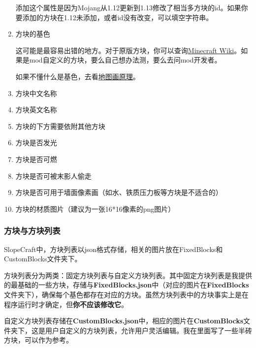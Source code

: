 \documentclass[UTF8]{ctexart}
\begin{document}
\begin{enumerate}
   添加这个属性是因为Mojang从1.12更新到1.13修改了相当多方块的id。如果你要添加的方块在1.12未添加，或者id没有改变，可以填空字符串。
   \item 方块的基色
   
   这可能是最容易出错的地方。对于原版方块，你可以查询\href{https://wiki.biligame.com/mc/%E5%9C%B0%E5%9B%BE%E7%89%A9%E5%93%81%E6%A0%BC%E5%BC%8F#idcounts.dat_.E6.A0.BC.E5.BC.8F}{Minecraft Wiki}。如果是mod自定义的方块，要么自己想办法测，要么去问mod开发者。
   
   如果不懂什么是基色，去看\href{https://github.com/ToKiNoBug/SlopeCraftTutorial/blob/main/BasicPrinciple/Principle%20of%20map%20pixel%20arts.md}{地图画原理}。
   \item 方块中文名称
   \item 方块英文名称
   \item 方块的下方需要依附其他方块
   \item 方块是否发光
   \item 方块是否可燃
   \item 方块是否可被末影人偷走
   \item 方块是否可用于墙面像素画（如水、铁质压力板等方块是不适合的）
   \item 方块的材质图片（建议为一张16*16像素的png图片）   
   \end{enumerate}

   \subsubsection{方块与方块列表}
   SlopeCraft中，方块列表以json格式存储，相关的图片放在FixedBlocks和CustomBlocks文件夹下。
   
   方块列表分为两类：固定方块列表与自定义方块列表。其中固定方块列表是我提供的最基础的一些方块，存储与\textbf{FixedBlocks.json}中（对应的图片在\textbf{FixedBlocks}文件夹下），确保每个基色都存在对应的方块。虽然方块列表中的方块事实上是在程序运行时才确定，但\textbf{你不应该修改它}。
   
   自定义方块列表存储在\textbf{CustomBlocks.json}中，相应的图片在\textbf{CustomBlocks}文件夹下，这是用户自定义的方块列表，允许用户灵活编辑。我在里面写了一些半砖方块，可以作为参考。
   
\end{document}
